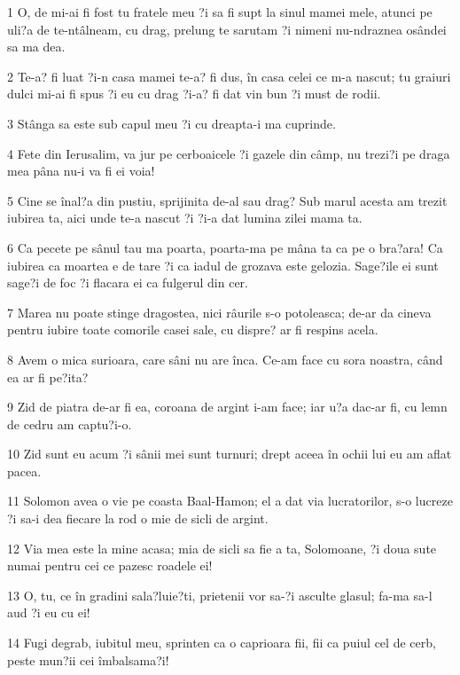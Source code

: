 \par 1 O, de mi-ai fi fost tu fratele meu ?i sa fi supt la sinul mamei mele, atunci pe uli?a de te-ntâlneam, cu drag, prelung te sarutam ?i nimeni nu-ndraznea osândei sa ma dea.
\par 2 Te-a? fi luat ?i-n casa mamei te-a? fi dus, în casa celei ce m-a nascut; tu graiuri dulci mi-ai fi spus ?i eu cu drag ?i-a? fi dat vin bun ?i must de rodii.
\par 3 Stânga sa este sub capul meu ?i cu dreapta-i ma cuprinde.
\par 4 Fete din Ierusalim, va jur pe cerboaicele ?i gazele din câmp, nu trezi?i pe draga mea pâna nu-i va fi ei voia!
\par 5 Cine se înal?a din pustiu, sprijinita de-al sau drag? Sub marul acesta am trezit iubirea ta, aici unde te-a nascut ?i ?i-a dat lumina zilei mama ta.
\par 6 Ca pecete pe sânul tau ma poarta, poarta-ma pe mâna ta ca pe o bra?ara! Ca iubirea ca moartea e de tare ?i ca iadul de grozava este gelozia. Sage?ile ei sunt sage?i de foc ?i flacara ei ca fulgerul din cer.
\par 7 Marea nu poate stinge dragostea, nici râurile s-o potoleasca; de-ar da cineva pentru iubire toate comorile casei sale, cu dispre? ar fi respins acela.
\par 8 Avem o mica surioara, care sâni nu are înca. Ce-am face cu sora noastra, când ea ar fi pe?ita?
\par 9 Zid de piatra de-ar fi ea, coroana de argint i-am face; iar u?a dac-ar fi, cu lemn de cedru am captu?i-o.
\par 10 Zid sunt eu acum ?i sânii mei sunt turnuri; drept aceea în ochii lui eu am aflat pacea.
\par 11 Solomon avea o vie pe coasta Baal-Hamon; el a dat via lucratorilor, s-o lucreze ?i sa-i dea fiecare la rod o mie de sicli de argint.
\par 12 Via mea este la mine acasa; mia de sicli sa fie a ta, Solomoane, ?i doua sute numai pentru cei ce pazesc roadele ei!
\par 13 O, tu, ce în gradini sala?luie?ti, prietenii vor sa-?i asculte glasul; fa-ma sa-l aud ?i eu cu ei!
\par 14 Fugi degrab, iubitul meu, sprinten ca o caprioara fii, fii ca puiul cel de cerb, peste mun?ii cei îmbalsama?i!


